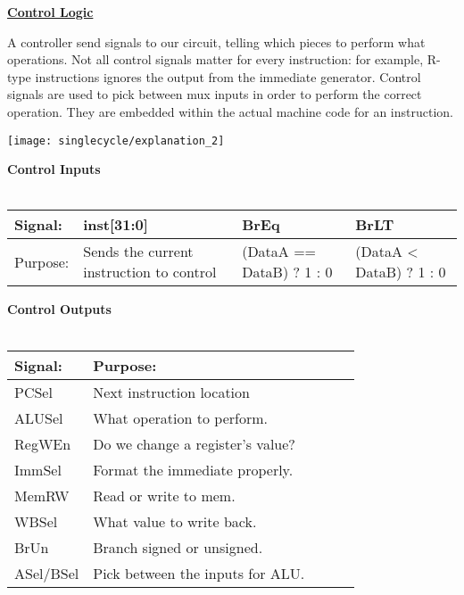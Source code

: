 \begin{blocksection}
\question

\textbf{\underline{Control Logic}}

A controller send signals to our circuit, telling which pieces to perform what operations.  Not all control signals matter for every instruction: for example, R-type instructions ignores the output from the immediate generator.  Control signals are used to pick between mux inputs in order to perform the correct operation.  They are embedded within the actual machine code for an instruction.

\texttt{[image: singlecycle/explanation\_2]}

\textbf{Control Inputs}\\\\
\begin{tabular}{ |l|l|l|l| } 
 \hline
 \textbf{Signal:} & \textbf{inst[31:0]} & \textbf{BrEq} & \textbf{BrLT} \\ 
 \hline
 Purpose: & Sends the current instruction to control & (DataA == DataB) ? 1 : 0 & (DataA < DataB) ? 1 : 0 \\ 
 \hline
\end{tabular}

\textbf{Control Outputs}\\\\
\begin{tabular}{ |l|l|l|l|l| } 
 \hline
 \textbf{Signal:} & \textbf{Purpose:} \\
 \hline
 \hline
 PCSel & Next instruction location \\
 \hline
 ALUSel & What operation to perform. \\
 \hline
 RegWEn & Do we change a register’s value? \\
 \hline
 ImmSel & Format the immediate properly.\\ 
 \hline
 MemRW & Read or write to mem. \\
 \hline
 WBSel & What value to write back. \\
 \hline 
 BrUn & Branch signed or unsigned. \\
 \hline 
 ASel/BSel & Pick between the inputs for ALU. \\
 \hline
\end{tabular}

\end{blocksection}